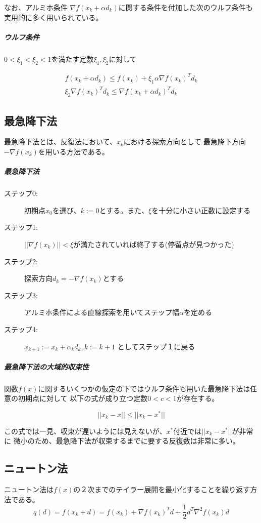 \documentclass{jsarticle}
\begin{document}
なお、アルミホ条件 $\nabla f(x_k + \alpha d_k)$に関する条件を付加した次のウルフ条件も
実用的に多く用いられている。

\subparagraph{ウルフ条件}
$0 < {\xi}_1 < {\xi}_2 < 1$を満たす定数${\xi}_1, {\xi}_2$に対して

\begin{eqnarray*}
f(x_k + \alpha d_k) \leq f(x_k) + {\xi}_1 \alpha \nabla f(x_k)^Td_k \\
{\xi}_2 \nabla f(x_k)^Td_k \leq \nabla f(x_k + \alpha d_k)^Td_k
\end{eqnarray*}

\subsection{最急降下法}
最急降下法とは、反復法において、$x_k$における探索方向として
最急降下方向$- \nabla f(x_k)$を用いる方法である。

\subparagraph{最急降下法}
\begin{description}
  \item[ステップ0:] 初期点$x_0$を選び、$k := 0$とする。また、$\xi$を十分に小さい正数に設定する
  \item[ステップ1:] $||\nabla f(x_k)|| < \xi$が満たされていれば終了する(停留点が見つかった)
  \item[ステップ2:] 探索方向$d_k = - \nabla f(x_k)$とする
  \item[ステップ3:] アルミホ条件による直線探索を用いてステップ幅$\alpha$を定める
  \item[ステップ4:] $x_{k+1} := x_k + {\alpha}_k d_k, k := k + 1$ としてステップ１に戻る
\end{description}

\subparagraph{最急降下法の大域的収束性}
関数$f(x)$に関するいくつかの仮定の下ではウルフ条件も用いた最急降下法は任意の初期点に対して
以下の式が成り立つ定数$0 < c < 1$が存在する。

$$
||x_k - x|| \leq ||x_k - x^{\ast}||
$$

この式では一見、収束が遅いようには見えないが、$x^{\ast}$付近では$||x_k - x^{\ast}||$が非常に
微小のため、最急降下法が収束するまでに要する反復数は非常に多い。

\subsection{ニュートン法}
ニュートン法は$f(x)$の２次までのテイラー展開を最小化することを繰り返す方法である。
$$
q(d) = f(x_k + d) = f(x_k) + \nabla f(x_k)^Td + \frac {1}{2} d^T {\nabla}^2 f(x_k)d
$$
\end{document}

